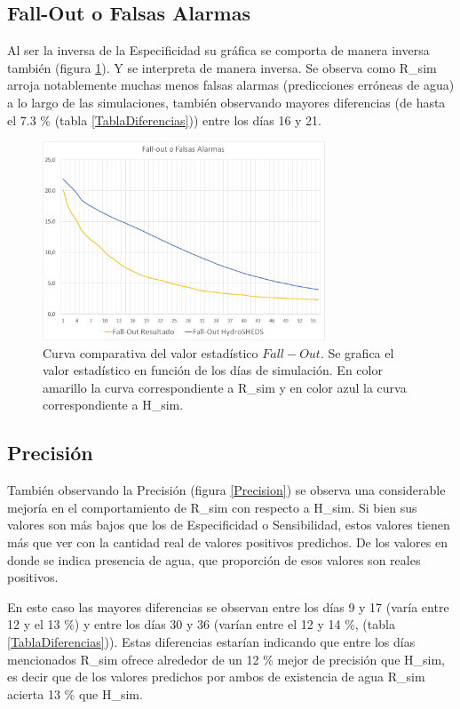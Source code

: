\documentclass[10pt,a4paper, twoside]{report}
\begin{document}
\subsection{Fall-Out o Falsas Alarmas}

Al ser la inversa de la Especificidad su gráfica se comporta de manera inversa también (figura \ref{fallout}). Y se interpreta de manera inversa. Se observa como R\_sim arroja notablemente muchas menos falsas alarmas (predicciones erróneas de agua) a lo largo de las simulaciones, también observando mayores diferencias (de hasta el 7.3 \% (tabla \ref{TablaDiferencias})) entre los días 16 y 21.

\begin{figure}[H]
   \centering      
   \includegraphics[width=0.75\textwidth]{imagenes/fallout.jpg}
 \caption{Curva comparativa del valor estadístico $Fall-Out$. Se grafica el valor estadístico en función de los días de simulación. En color amarillo la curva correspondiente a R\_sim y en color azul la curva correspondiente a H\_sim.}
 \label{fallout}
\end{figure}



\subsection{Precisión}

También observando la Precisión (figura \ref{Precision}) se observa una considerable mejoría en el comportamiento de R\_sim con respecto a H\_sim. Si bien sus valores son más bajos que los de Especificidad o Sensibilidad, estos valores tienen más que ver con la cantidad real de valores positivos predichos. De los valores en donde se indica presencia de agua, que proporción de esos valores son reales positivos.

En este caso las mayores diferencias se observan entre los días 9 y 17 (varía entre 12 y el 13 \%) y entre los días 30 y 36 (varían entre el 12 y 14 \%, (tabla \ref{TablaDiferencias})). Estas diferencias estarían indicando que entre los días mencionados R\_sim ofrece alrededor de un 12 \% mejor de precisión que H\_sim, es decir que de los valores predichos por ambos de existencia de agua R\_sim acierta 13 \% que H\_sim.
\end{document}

